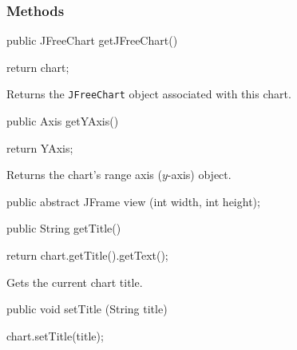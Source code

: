 \subsubsection*{Methods}

\begin{code}

   public JFreeChart getJFreeChart() \begin{hide} {
      return chart;
   }\end{hide}
\end{code}
\begin{tabb}
   Returns the \texttt{JFreeChart} object associated with this chart.
\end{tabb}
\begin{htmlonly}
\end{htmlonly}
\begin{code}

   public Axis getYAxis() \begin{hide} {
      return YAxis;
   }\end{hide}
\end{code}
\begin{tabb}
   Returns the chart's range axis ($y$-axis) object.
\end{tabb}
\begin{htmlonly}
\end{htmlonly}
\begin{code}

   public abstract JFrame view (int width, int height);
\end{code}
\begin{code}

   public String getTitle() \begin{hide} {
      return chart.getTitle().getText();
   }\end{hide}
\end{code}
\begin{tabb}
   Gets the current chart title.
\end{tabb}
\begin{htmlonly}
\end{htmlonly}
\begin{code}

   public void setTitle (String title) \begin{hide} {
      chart.setTitle(title);
   }\end{hide}
\end{code}
